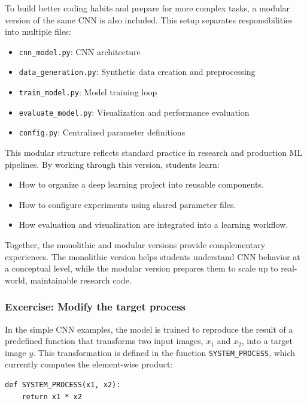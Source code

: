 \documentclass{article}
\begin{document}
To build better coding habits and prepare for more complex tasks, a modular version of the same CNN is also included. This setup separates responsibilities into multiple files:
\begin{itemize}
    \item \texttt{cnn\_model.py}: CNN architecture
    \item \texttt{data\_generation.py}: Synthetic data creation and preprocessing
    \item \texttt{train\_model.py}: Model training loop
    \item \texttt{evaluate\_model.py}: Visualization and performance evaluation
    \item \texttt{config.py}: Centralized parameter definitions
\end{itemize}

This modular structure reflects standard practice in research and production ML pipelines. By working through this version, students learn:
\begin{itemize}
    \item How to organize a deep learning project into reusable components.
    \item How to configure experiments using shared parameter files.
    \item How evaluation and visualization are integrated into a learning workflow.
\end{itemize}

Together, the monolithic and modular versions provide complementary experiences. The monolithic version helps students understand CNN behavior at a conceptual level, while the modular version prepares them to scale up to real-world, maintainable research code.

\subsubsection{Excercise: Modify the target process}
\label{sec:simpleexcercise}

In the simple CNN examples, the model is trained to reproduce the result of a predefined function that transforms two input images, $x_1$ and $x_2$, into a target image $y$. This transformation is defined in the function \texttt{SYSTEM\_PROCESS}, which currently computes the element-wise product:

\begin{verbatim}
def SYSTEM_PROCESS(x1, x2):
    return x1 * x2
\end{verbatim}
\end{document}
